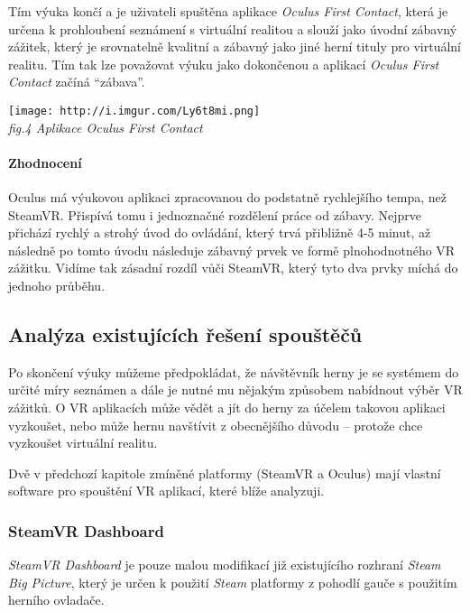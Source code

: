 Tím výuka končí a je uživateli spuštěna aplikace \emph{Oculus First
Contact}, která je určena k prohloubení seznámení s virtuální realitou a
slouží jako úvodní zábavný zážitek, který je srovnatelně kvalitní a
zábavný jako jiné herní tituly pro virtuální realitu. Tím tak lze
považovat výuku jako dokončenou a aplikací \emph{Oculus First Contact}
začíná ``zábava''.

\texttt{[image: http://i.imgur.com/Ly6t8mi.png]}\\
\emph{fig.4 Aplikace Oculus First Contact}

\paragraph{Zhodnocení}\label{zhodnocenuxed-1}

Oculus má výukovou aplikaci zpracovanou do podstatně rychlejšího tempa,
než SteamVR. Přispívá tomu i jednoznačné rozdělení práce od zábavy.
Nejprve přichází rychlý a strohý úvod do ovládání, který trvá přibližně
4-5 minut, až následně po tomto úvodu následuje zábavný prvek ve formě
plnohodnotného VR zážitku. Vidíme tak zásadní rozdíl vůči SteamVR, který
tyto dva prvky míchá do jednoho průběhu.

\subsection{Analýza existujících řešení
spouštěčů}\label{analuxfdza-existujuxedcuxedch-ux159eux161enuxed-spouux161tux11bux10dux16f}

Po skončení výuky můžeme předpokládat, že návštěvník herny je se
systémem do určité míry seznámen a dále je nutné mu nějakým způsobem
nabídnout výběr VR zážitků. O VR aplikacích může vědět a jít do herny za
účelem takovou aplikaci vyzkoušet, nebo může hernu navštívit z
obecnějšího důvodu -- protože chce vyzkoušet virtuální realitu.

Dvě v předchozí kapitole zmíněné platformy (SteamVR a Oculus) mají
vlastní software pro spouštění VR aplikací, které blíže analyzuji.

\subsubsection{SteamVR Dashboard}\label{steamvr-dashboard}

\emph{SteamVR Dashboard} je pouze malou modifikací již existujícího
rozhraní \emph{Steam Big Picture}, který je určen k použití \emph{Steam}
platformy z pohodlí gauče s použitím herního ovladače.

